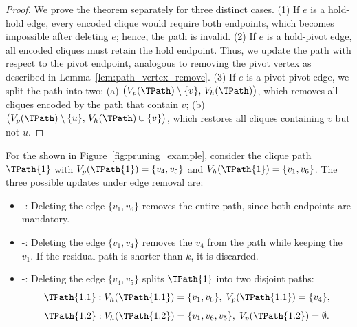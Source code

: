 \begin{proof}
We prove the theorem separately for three distinct cases.  
%
(1) If $e$ is a hold-hold edge, every encoded clique would require both endpoints, which becomes impossible after deleting $e$; hence, the path is invalid.  
%
(2) If $e$ is a hold-pivot edge, all encoded cliques must retain the hold endpoint. 
Thus, we update the path with respect to the pivot endpoint, analogous to removing the pivot vertex as described in Lemma~\ref{lem:path_vertex_remove}.  
%
(3) If $e$ is a pivot-pivot edge, we split the path into two:  
(a) $\bigl(V_p(\TPath)\setminus\{v\},\, V_h(\TPath)\bigr)$, which removes all cliques encoded by the path that contain $v$;  
(b) $\bigl(V_p(\TPath)\setminus\{u\},\, V_h(\TPath)\cup\{v\}\bigr)$, which restores all cliques containing $v$ but not $u$.
\end{proof}

\begin{example}
For the \cpi shown in Figure~\ref{fig:pruning_example}, consider the clique path $\TPath{1}$ with
$V_{p}(\TPath{1}) = \{v_4, v_5\}$ and
$V_{h}(\TPath{1}) = \{v_1, v_6\}$.
The three possible updates under edge removal are:

\begin{itemize}[leftmargin=*]
  \item \hold-\hold: Deleting the edge $\{v_1,v_6\}$ removes the entire path, since both endpoints are mandatory.
  \item \hold-\pivot: Deleting the edge $\{v_1,v_4\}$ removes the \pivot $v_4$ from the path while keeping the \hold $v_1$. If the residual path is shorter than $k$, it is discarded.
  \item \pivot-\pivot: Deleting the edge $\{v_4,v_5\}$ splits $\TPath{1}$ into two disjoint paths:
  \[
    \TPath{1.1} : V_{h}(\TPath{1.1}) = \{v_1, v_6\}, \; V_{p}(\TPath{1.1}) = \{v_4\},
  \]
  \[
    \TPath{1.2} : V_{h}(\TPath{1.2}) = \{v_1, v_6, v_5\}, \; V_{p}(\TPath{1.2}) = \emptyset.
  \]
\end{itemize}
\end{example}


